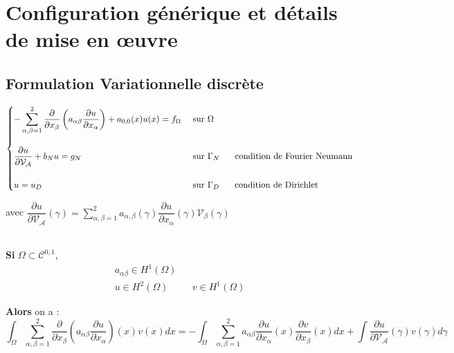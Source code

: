 \documentclass[12pt,a4paper]{article}
\begin{document}
	\newpage
	
	\section{Configuration générique et détails de mise en œuvre}
	
	\subsection{Formulation Variationnelle discrète}
	
	$\begin{cases}
		-\displaystyle\sum_{\alpha,\beta=1}^2 \dfrac{\partial }{\partial x_\beta}\left(a_{\alpha\beta}\dfrac{\partial u}{\partial x_\alpha}\right) + a_{0,0}(x)u(x) =f_\Omega & \text{ sur }\Omega \\\\
		\dfrac{\partial u}{\partial \mathcal V_\mathcal{A}} + b_Nu = g_N & \text{ sur } \Gamma_N \hspace{.5cm} \text{ condition de Fourier Neumann} \\\\
		u = u_D & \text{ sur }\Gamma_D \hspace{.5cm} \text{ condition de Dirichlet}
	\end{cases}$
	
	avec $\dfrac{\partial u}{\partial \mathcal V_\mathcal{A}}(\gamma) = \displaystyle\sum_{\alpha,\beta=1}^2 a_{\alpha,\beta}(\gamma)\dfrac{\partial u}{\partial x_\alpha}(\gamma)\mathcal{V}_\beta(\gamma)$
	
	\begin{cor}$ $\\
		\textbf{Si} $\Omega \subset \mathcal C^{0,1}$, 
		\[
		\begin{aligned}
			a_{\alpha\beta} \in H^1(\Omega)\\
			u \in H^2(\Omega) & & v \in H^1(\Omega)
		\end{aligned}
		\]
		
		\textbf{Alors} on a :
		\[
		\displaystyle \int_\Omega \sum_{\alpha,\beta=1}^2 \dfrac{\partial}{\partial x_\beta}\left(a_{\alpha\beta}\dfrac{\partial u}{\partial x_\alpha}\right)(x) v(x) dx = -\int_\Omega \sum_{\alpha,\beta= 1}^2 a_{\alpha\beta} \dfrac{\partial u}{\partial x_\alpha}(x)\dfrac{\partial v}{\partial x_\beta}(x) dx + \int \frac{\partial u}{\partial \mathcal V_{\mathcal A}}(\gamma)v(\gamma)d\gamma
		\]
	\end{cor}
	
\end{document}
